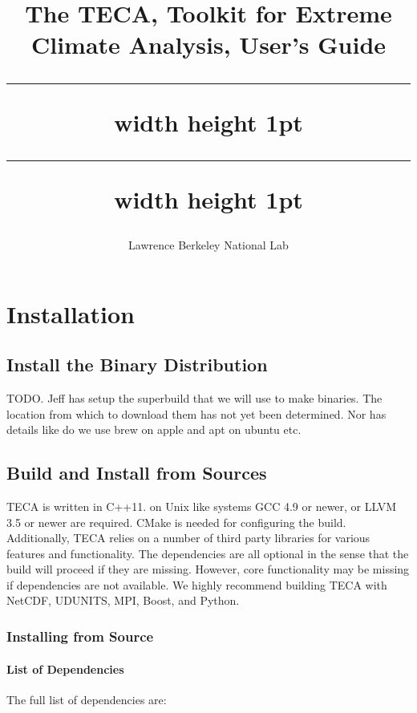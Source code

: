 \documentclass[a4paper,10pt,DIV=12]{scrreprt}
\title{%
The TECA, Toolkit for Extreme Climate Analysis, User's Guide \\ \vspace{3mm} %
\hrule width \hsize height 1pt \vspace{0.51mm} %
\hrule width \hsize height 1pt}
\subtitle{Lawrence Berkeley National Lab}
\author{}
\begin{document}
\maketitle


\tableofcontents

\chapter{Installation}
\section{Install the Binary Distribution}
TODO. Jeff has setup the superbuild that we will use to make binaries. The location
from which to download them has not yet been determined. Nor has details like do we use
brew on apple and apt on ubuntu etc.

\section{Build and Install from Sources}
\label{sec:build}
TECA is written in C++11. on Unix like systems
GCC 4.9 or newer, or LLVM 3.5 or newer are required. CMake is needed for configuring the build.
Additionally, TECA relies on a number of third party libraries for various
features and functionality. The dependencies are all optional in the sense
that the build will proceed if they are missing. However, core functionality
may be missing if dependencies are not available. We highly recommend building
TECA with NetCDF, UDUNITS, MPI, Boost, and Python.

\subsection{Installing from Source}
\subsubsection{List of Dependencies}
The full list of dependencies are:
\end{document}
